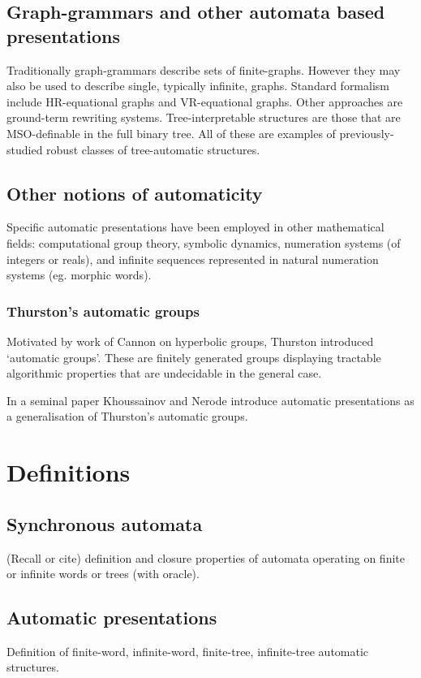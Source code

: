 \documentclass{book}
\begin{document}
\fi

\subsection{Graph-grammars and other automata based presentations}
Traditionally graph-grammars describe sets of finite-graphs. However they may
also be used to describe single, typically infinite, graphs. Standard formalism
include HR-equational graphs and VR-equational graphs. Other approaches are
ground-term rewriting systems. Tree-interpretable structures are
those that are MSO-definable in the full binary tree. All of these are examples
of previously-studied robust classes of tree-automatic structures.

\subsection{Other notions of automaticity}
Speciﬁc automatic presentations have been employed in other mathematical
ﬁelds: computational group theory, symbolic dynamics, numeration
systems (of integers or reals), and infinite sequences represented in natural
numeration systems (eg. morphic words).

\subsubsection{Thurston's automatic groups}
Motivated by work of Cannon on hyperbolic groups, Thurston
introduced `automatic groups'. These are finitely generated groups displaying
tractable algorithmic properties that are undecidable in the general case.

In a seminal paper Khoussainov and Nerode introduce automatic presentations as
a generalisation of Thurston's automatic groups.

\section{Definitions}
\subsection{Synchronous automata}
(Recall or cite) definition and closure properties of automata operating on finite or infinite words or trees (with oracle).

\subsection{Automatic presentations}
Definition of finite-word, infinite-word, finite-tree, infinite-tree automatic structures.
\end{document}
